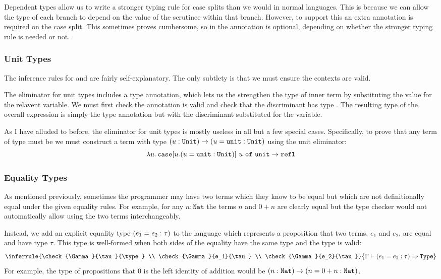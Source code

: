 \documentclass[12pt,a4paper,twoside]{report}
\begin{document}
Dependent types allow us to write a stronger typing rule for case splits than we would in normal languages.
This is because we can allow the type of each branch to depend on the value of the scrutinee within that branch.
However, to support this an extra annotation is required on the case split.
This sometimes proves cumbersome, so in \pimu{} the annotation is optional, depending on whether the stronger typing rule is needed or not.

\subsubsection{Unit Types}

The inference rules for \Unit{} and \unit{} are fairly self-explanatory.
The only subtlety is that we must ensure the contexts are valid.

The eliminator for unit types includes a type annotation, which lets us the strengthen the type of inner term by substituting the value \unit{} for the relavent variable.
We must first check the annotation is valid and check that the discriminant has type \Unit{}.
The resulting type of the overall expression is simply the type annotation but with the discriminant substituted for the variable.

As I have alluded to before, the eliminator for unit types is mostly useless in all but a few special cases.
Specifically, to prove that any term of type \Unit{} must be \unit{} we must construct a term with type \((u : \mathtt{Unit}) \rightarrow (u = \mathtt{unit} : \mathtt{Unit})\) using the unit eliminator:
\[
    \lambda u \ldotp \texttt{case}[u.(u = \mathtt{unit} : \mathtt{Unit})]\ u\ \texttt{of}\ \texttt{unit} \rightarrow \mathtt{refl}
\]

\subsubsection{Equality Types}

As mentioned previously, sometimes the programmer may have two terms which they know to be equal but which are not definitionally equal under the given equality rules.
For example, for any \(n : \mathtt{Nat}\) the terms \(n\) and \(0 + n\) are clearly equal but the type checker would not automatically allow using the two terms interchangeably.

Instead, we add an explicit equality type \((e_1 = e_2 : \tau)\) to the language which represents a proposition that two terms, \(e_1\) and \(e_2\), are equal and have type \(\tau\).
This type is well-formed when both sides of the equality have the same type and the type is valid:
\[
    \inferrule{\check{\Gamma}{\tau}{\type} \\ \check{\Gamma}{e_1}{\tau} \\ \check{\Gamma}{e_2}{\tau}} {\infer{\Gamma}{\eq{e_1}{e_2}{\tau}}{\type}}
\]
For example, the type of propositions that \(0\) is the left identity of addition would be \((n : \texttt{Nat}) \rightarrow (n = 0 + n : \texttt{Nat})\).
\end{document}
